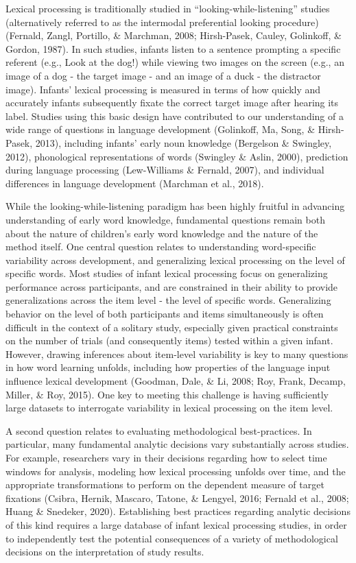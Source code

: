 \documentclass[10pt, letterpaper]{article}
\begin{document}
Lexical processing is traditionally studied in
``looking-while-listening'' studies (alternatively referred to as the
intermodal preferential looking procedure) (Fernald, Zangl, Portillo, \&
Marchman, 2008; Hirsh-Pasek, Cauley, Golinkoff, \& Gordon, 1987). In
such studies, infants listen to a sentence prompting a specific referent
(e.g., Look at the dog!) while viewing two images on the screen (e.g.,
an image of a dog - the target image - and an image of a duck - the
distractor image). Infants' lexical processing is measured in terms of
how quickly and accurately infants subsequently fixate the correct
target image after hearing its label. Studies using this basic design
have contributed to our understanding of a wide range of questions in
language development (Golinkoff, Ma, Song, \& Hirsh-Pasek, 2013),
including infants' early noun knowledge (Bergelson \& Swingley, 2012),
phonological representations of words (Swingley \& Aslin, 2000),
prediction during language processing (Lew-Williams \& Fernald, 2007),
and individual differences in language development (Marchman et al.,
2018).

While the looking-while-listening paradigm has been highly fruitful in
advancing understanding of early word knowledge, fundamental questions
remain both about the nature of children's early word knowledge and the
nature of the method itself. One central question relates to
understanding word-specific variability across development, and
generalizing lexical processing on the level of specific words. Most
studies of infant lexical processing focus on generalizing performance
across participants, and are constrained in their ability to provide
generalizations across the item level - the level of specific words.
Generalizing behavior on the level of both participants and items
simultaneously is often difficult in the context of a solitary study,
especially given practical constraints on the number of trials (and
consequently items) tested within a given infant. However, drawing
inferences about item-level variability is key to many questions in how
word learning unfolds, including how properties of the language input
influence lexical development (Goodman, Dale, \& Li, 2008; Roy, Frank,
Decamp, Miller, \& Roy, 2015). One key to meeting this challenge is
having sufficiently large datasets to interrogate variability in lexical
processing on the item level.

A second question relates to evaluating methodological best-practices.
In particular, many fundamental analytic decisions vary substantially
across studies. For example, researchers vary in their decisions
regarding how to select time windows for analysis, modeling how lexical
processing unfolds over time, and the appropriate transformations to
perform on the dependent measure of target fixations (Csibra, Hernik,
Mascaro, Tatone, \& Lengyel, 2016; Fernald et al., 2008; Huang \&
Snedeker, 2020). Establishing best practices regarding analytic
decisions of this kind requires a large database of infant lexical
processing studies, in order to independently test the potential
consequences of a variety of methodological decisions on the
interpretation of study results.
\end{document}
